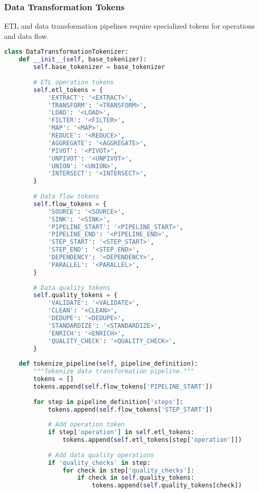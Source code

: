 \subsubsection{Data Transformation Tokens}

ETL and data transformation pipelines require specialized tokens for operations and data flow.

\begin{lstlisting}[language=Python, caption=Data transformation and ETL tokenization]
class DataTransformationTokenizer:
    def __init__(self, base_tokenizer):
        self.base_tokenizer = base_tokenizer
        
        # ETL operation tokens
        self.etl_tokens = {
            'EXTRACT': '<EXTRACT>',
            'TRANSFORM': '<TRANSFORM>',
            'LOAD': '<LOAD>',
            'FILTER': '<FILTER>',
            'MAP': '<MAP>',
            'REDUCE': '<REDUCE>',
            'AGGREGATE': '<AGGREGATE>',
            'PIVOT': '<PIVOT>',
            'UNPIVOT': '<UNPIVOT>',
            'UNION': '<UNION>',
            'INTERSECT': '<INTERSECT>',
        }
        
        # Data flow tokens
        self.flow_tokens = {
            'SOURCE': '<SOURCE>',
            'SINK': '<SINK>',
            'PIPELINE_START': '<PIPELINE_START>',
            'PIPELINE_END': '<PIPELINE_END>',
            'STEP_START': '<STEP_START>',
            'STEP_END': '<STEP_END>',
            'DEPENDENCY': '<DEPENDENCY>',
            'PARALLEL': '<PARALLEL>',
        }
        
        # Data quality tokens
        self.quality_tokens = {
            'VALIDATE': '<VALIDATE>',
            'CLEAN': '<CLEAN>',
            'DEDUPE': '<DEDUPE>',
            'STANDARDIZE': '<STANDARDIZE>',
            'ENRICH': '<ENRICH>',
            'QUALITY_CHECK': '<QUALITY_CHECK>',
        }
    
    def tokenize_pipeline(self, pipeline_definition):
        """Tokenize data transformation pipeline."""
        tokens = []
        tokens.append(self.flow_tokens['PIPELINE_START'])
        
        for step in pipeline_definition['steps']:
            tokens.append(self.flow_tokens['STEP_START'])
            
            # Add operation token
            if step['operation'] in self.etl_tokens:
                tokens.append(self.etl_tokens[step['operation']])
            
            # Add data quality operations
            if 'quality_checks' in step:
                for check in step['quality_checks']:
                    if check in self.quality_tokens:
                        tokens.append(self.quality_tokens[check])
            

\end{lstlisting}
